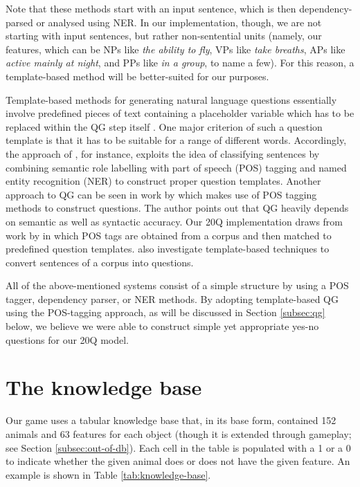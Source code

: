 \documentclass[11pt,a4paper]{article}
\begin{document}
Note that these methods start with an input sentence, which is then dependency-parsed or analysed using NER.
In our implementation, though, we are not starting with input sentences, but rather non-sentential units (namely, our features, which can be NPs like \textit{the ability to fly}, VPs like \textit{take breaths}, APs like \textit{active mainly at night}, and PPs like \textit{in a group}, to name a few).
For this reason, a template-based method will be better-suited for our purposes.

Template-based methods for generating natural language questions essentially involve predefined pieces of text containing a placeholder variable which has to be replaced within the QG step itself \citep{Mandasari2019}. 
One major criterion of such a question template is that it has to be suitable for a range of different words. 
Accordingly, the approach of \citet{Mandasari2019}, for instance, exploits the idea of classifying sentences by combining semantic role labelling with part of speech (POS) tagging and named entity recognition (NER) to construct proper question templates. 
Another approach to QG can be seen in work by \citet{Zerr2014} which makes use of POS tagging methods to construct questions. 
The author points out that QG heavily depends on semantic as well as syntactic accuracy. 
Our 20Q implementation draws from work by \citet{Zerr2014} in which POS tags are obtained from a corpus and then matched to predefined question templates. 
\citet{FabbriEa2020} also investigate template-based techniques to convert sentences of a corpus into questions. 

All of the above-mentioned systems consist of a simple structure by using a POS tagger, dependency parser, or NER methods. 
By adopting template-based QG using the POS-tagging approach, as will be discussed in Section \ref{subsec:qg} below, we believe we were able to construct simple yet appropriate yes-no questions for our 20Q model.

\section{The knowledge base}
\label{sec:knowledge-base}

Our game uses a tabular knowledge base that, in its base form, contained 152 animals and 63 features for each object (though it is extended through gameplay; see Section \ref{subsec:out-of-db}).
Each cell in the table is populated with a 1 or a 0 to indicate whether the given animal does or does not have the given feature. 
An example is shown in Table \ref{tab:knowledge-base}.
\end{document}
